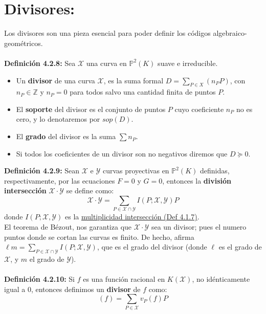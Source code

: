 \documentclass[11pt,spanish]{book}
\begin{document}
\section{Divisores:}
Los divisores son una pieza esencial para poder definir los códigos algebraico-geométricos.\\
\\\textbf{Definición 4.2.8: } Sea $\mathbf{\mathcal{X}}$ una curva en $\mathbb{P}^{2}(K)$ suave e irreducible.
\begin{itemize}
    \item Un \textbf{divisor} de una curva $\mathbf{\mathcal{X}}$, es la suma formal $D=\sum_{P\in X}(n_{P}P)$, con $n_{P}\in\mathbb{Z}$ y $n_{P}=0$ para todos salvo una cantidad finita de puntos $P$.
    \item El \textbf{soporte} del divisor es el conjunto de puntos $P$ cuyo coeficiente $n_{P}$ no es cero, y lo denotaremos por $sop(D)$.
    \item El \textbf{grado} del divisor es la suma $\sum n_{P}$. 
    \item Si todos los coeficientes de un divisor son no negativos diremos que $D\succeq 0$.
\end{itemize}
\textbf{Definición 4.2.9:}  Sean $\mathbf{\mathcal{X}}$ e $\mathbf{\mathcal{Y}}$ curvas proyectivas en $\mathbb{P}^{2}(K)$ definidas, respectivamente, por las ecuaciones $F=0$ y $G=0$, entonces la \textbf{división intersección} $\mathbf{\mathcal{X}}\cdot\mathbf{\mathcal{Y}}$ se define como:
    $$\mathbf{\mathcal{X}}\cdot\mathbf{\mathcal{Y}}=\sum_{P\in \mathbf{\mathcal{X}}\cap \mathbf{\mathcal{Y}}} I(P;\mathbf{\mathcal{X}},\mathbf{\mathcal{Y}})P$$
    donde $I(P;\mathbf{\mathcal{X}},\mathbf{\mathcal{Y}})$ es la \hyperlink{intermult}{multiplicidad intersección (Def 4.1.7)}.\\
    
    El teorema de Bézout, nos garantiza que $\mathbf{\mathcal{X}}\cdot\mathbf{\mathcal{Y}}$ sea un divisor; pues el numero puntos donde se cortan las curvas es finito. De hecho, afirma $\ell m=\sum_{P\in \mathbf{\mathcal{X}}\cap \mathbf{\mathcal{Y}}} I(P;\mathbf{\mathcal{X}},\mathbf{\mathcal{Y}})$, que es el grado del divisor (donde $\ell$ es el grado de $\mathbf{\mathcal{X}}$, y $m$ el grado de $\mathbf{\mathcal{Y}}$).\\
\\ \textbf{Definición 4.2.10:} Si $f$ es una función racional en $K(\mathbf{\mathcal{X}})$, no idénticamente igual a $0$, entonces definimos un \textbf{divisor} de $f$ como:\\
$$(f)=\sum_{P\in \mathbf{\mathcal{X}}}v_{P}(f)P$$
\end{document}
